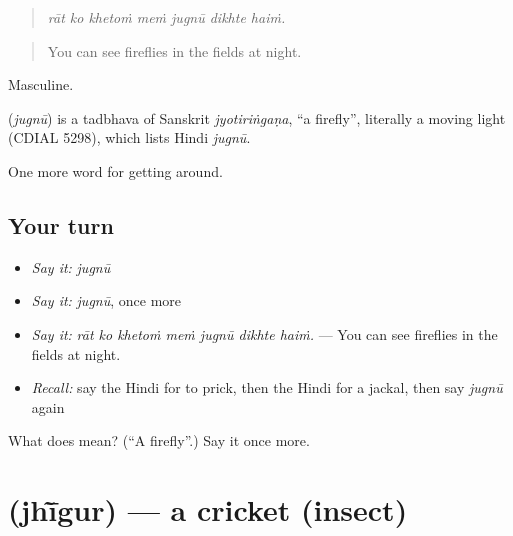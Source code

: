 \begin{quote}
      
\end{quote}

\begin{quote}
\emph{rāt ko khetoṁ meṁ jugnū dikhte haiṁ.}
\end{quote}

\begin{quote}
You can see fireflies in the fields at night.
\end{quote}

Masculine.

\begin{cousinweb}
\textbf{} (\emph{jugnū}) is a tadbhava of Sanskrit \emph{jyotiriṅgaṇa}, \textquotedblleft{}a firefly\textquotedblright{}, literally a moving light (CDIAL 5298), which lists Hindi \emph{jugnū}.
\end{cousinweb}

\begin{grammarlens}[title={What you've built}]
One more word for getting around.
\end{grammarlens}

\subsection*{Your turn}
\begin{itemize}
\raggedright
  \item \emph{Say it:} \emph{jugnū}
  \item \emph{Say it:} \emph{jugnū}, once more
  \item \emph{Say it:} \emph{rāt ko khetoṁ meṁ jugnū dikhte haiṁ.} — You can see fireflies in the fields at night.
  \item \emph{Recall:} say the Hindi for to prick, then the Hindi for a jackal, then say \emph{jugnū} again
\end{itemize}

\begin{tcolorbox}[breakable,colback=teal!4,colframe=teal!35!black,title={Before you move on}]
What does  mean? (\textquotedblleft{}A firefly\textquotedblright{}.) Say it once more.
\end{tcolorbox}
\section[\texorpdfstring{\hi{झींगुर} (jhī̃gur)}{झींगुर (jhī̃gur)}]{ (jhī̃gur) — a cricket (insect)}

